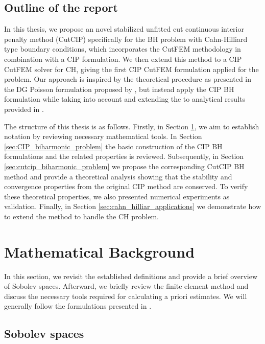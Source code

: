 \documentclass[11pt]{article}
\theoremstyle{remark}
\numberwithin{equation}{section}
\begin{document}
\subsection{Outline of the report}%
\label{sub:outline_of_the_report}
In this thesis, we propose an novel stabilized unfitted cut continuous interior penalty method (CutCIP) specifically for the BH problem with Cahn-Hilliard type boundary conditions, which incorporates the CutFEM methodology in combination with a CIP
formulation. We then extend this method to a CIP CutFEM solver for CH, giving the first CIP CutFEM formulation applied for the problem.
Our approach is inspired by the theoretical
procedure as presented in the DG Poisson formulation proposed by \cite{gurkan2019stabilized}, but instead apply the CIP BH formulation while taking into account and extending the to analytical results provided in \cite{feng2007fully, brenner2012quadratic}.

The structure of this thesis is as follows. Firstly, in Section \ref{sec:mathematical_background}, we aim to establish notation by reviewing necessary mathematical tools. In Section \ref{sec:CIP_biharmonic_problem} the basic construction of the CIP
BH formulations and the related properties is reviewed. Subsequently, in Section \ref{sec:cutcip_biharmonic_problem} we propose the corresponding CutCIP BH method and provide a theoretical analysis showing that the stability and convergence
properties from the original CIP method are conserved. To verify these theoretical properties, we also presented numerical experiments as validation. Finally, in Section \ref{sec:cahn_hilliar_applications} we demonstrate how to extend the method to handle the CH problem.




\section{Mathematical Background}%
\label{sec:mathematical_background}

In this section, we revisit the established definitions and provide a brief overview of Sobolev spaces. Afterward, we briefly review the finite element method and discuss the necessary tools required for calculating a priori estimates. We will
generally follow the formulations presented in \cite{pietro2012, ErnGuermond2021}.


\subsection{Sobolev spaces}%
\label{sub:notation}
\end{document}
